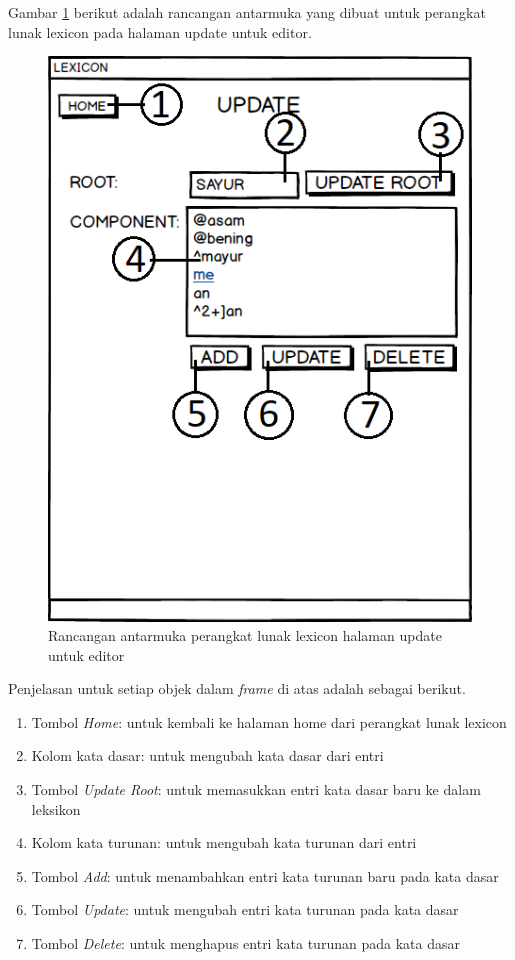 Gambar \ref{mockup-lexicon-update-editor} berikut adalah rancangan antarmuka yang dibuat untuk perangkat lunak lexicon pada halaman update untuk editor.

\begin{figure}[H]
\centering
\includegraphics[scale=0.8]{Gambar/mockup-lexicon-update-editor}
\caption{Rancangan antarmuka perangkat lunak lexicon halaman update untuk editor} 
\label{mockup-lexicon-update-editor}
\end{figure}

Penjelasan untuk setiap objek dalam \textit{frame} di atas adalah sebagai berikut.

\begin{enumerate}
	\item Tombol \textit{Home}: untuk kembali ke halaman home dari perangkat lunak lexicon
	\item Kolom kata dasar: untuk mengubah kata dasar dari entri
	\item Tombol \textit{Update Root}: untuk memasukkan entri kata dasar baru ke dalam leksikon
	\item Kolom kata turunan: untuk mengubah kata turunan dari entri
	\item Tombol \textit{Add}: untuk menambahkan entri kata turunan baru pada kata dasar
	\item Tombol \textit{Update}: untuk mengubah entri kata turunan pada kata dasar
	\item Tombol \textit{Delete}: untuk menghapus entri kata turunan pada kata dasar
\end{enumerate}

